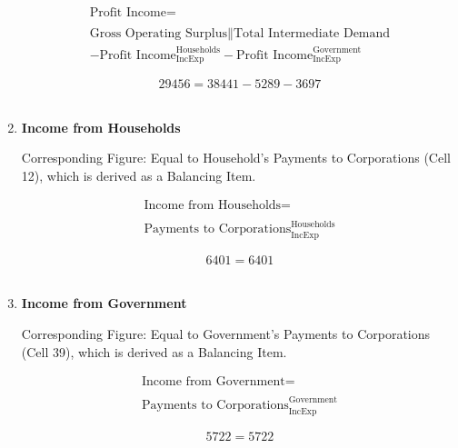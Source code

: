 \begin{enumerate}
\begin{equation}
\begin{split}
\text{Profit Income} =  \\ \\
\text{Gross Operating Surplus}\|\text{Total Intermediate Demand}\\
-\text{Profit Income}^\text{Households}_\text{IncExp}-\text{Profit Income}^\text{Government}_\text{IncExp}
\end{split} \label{eq:2.5.23}
\end{equation}

\begin{equation} \nonumber
29456 = 38441-5289-3697
\end{equation}\\


\item \textbf {Income from Households}

Corresponding Figure: Equal to Household's Payments to Corporations (Cell 12), which is derived as a Balancing Item.

\begin{equation}
\begin{split}
\text{Income from Households} =  \\ \\
\text{Payments to Corporations}^\text{Households}_\text{IncExp}
\end{split} \label{eq:2.5.24}
\end{equation}

\begin{equation} \nonumber
6401 = 6401
\end{equation}\\


\item \textbf {Income from Government}

Corresponding Figure: Equal to Government's Payments to Corporations (Cell 39), which is derived as a Balancing Item.

\begin{equation}
\begin{split}
\text{Income from Government} =  \\ \\
\text{Payments to Corporations}^\text{Government}_\text{IncExp}
\end{split} \label{eq:2.5.25}
\end{equation}

\begin{equation} \nonumber
5722 = 5722
\end{equation}\\



\end{enumerate}
